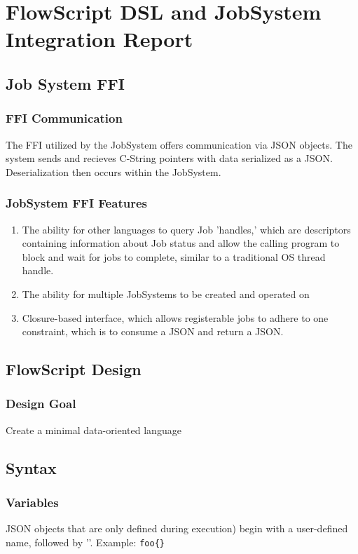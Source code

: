 \documentclass{article}
\begin{document}
\section*{FlowScript DSL and JobSystem Integration Report}
	\subsection{Job System FFI}
		\subsubsection{FFI Communication}
			The FFI utilized by the JobSystem offers communication via JSON objects. The system sends and recieves C-String pointers with data serialized as a JSON. Deserialization then occurs within the JobSystem.
		\subsubsection{JobSystem FFI Features}
			\begin{enumerate}
				\item The ability for other languages to query Job 'handles,' which are descriptors containing information about Job status and allow the calling program to block and wait for jobs to complete, similar to a traditional OS thread handle.
				\item The ability for multiple JobSystems to be created and operated on
				\item Closure-based interface, which allows registerable jobs to adhere to one constraint, which is to consume a JSON and return a JSON.
			\end{enumerate}
	\subsection{FlowScript Design}
		\subsubsection{Design Goal}
			Create a minimal data-oriented language
		\subsection{Syntax}
			\subsubsection{Variables} JSON objects that are only defined during execution) begin with a user-defined name, followed by '{}'. Example: \texttt{foo\{\}}
\end{document}
